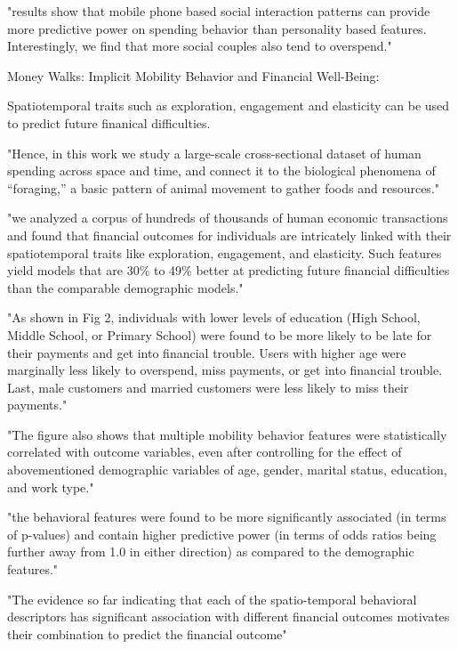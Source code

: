 {"results show that mobile phone based social interaction patterns can provide more predictive power on spending behavior than personality based features. Interestingly, we find that more social couples also tend to overspend."




Money Walks: Implicit Mobility Behavior and Financial Well-Being:

Spatiotemporal traits such as exploration, engagement and elasticity can be used to predict future finanical difficulties. 

"Hence, in this work we study a large-scale cross-sectional dataset of human spending across space and time, and connect it to the biological phenomena of “foraging,” a basic pattern of animal movement to gather foods and resources."

"we analyzed a corpus of hundreds of thousands of human economic transactions and found that financial outcomes for individuals are intricately linked with their spatiotemporal traits like exploration, engagement, and elasticity. Such features yield models that are 30\% to 49\% better at predicting future financial difficulties than the comparable demographic models."

"As shown in Fig 2, individuals with lower levels of education (High School, Middle School, or Primary School) were found to be more likely to be late for their payments and get into financial trouble. Users with higher age were marginally less likely to overspend, miss payments, or get into financial trouble. Last, male customers and married customers were less likely to miss their payments."

"The figure also shows that multiple mobility behavior features were statistically correlated with outcome variables, even after controlling for the effect of abovementioned demographic variables of age, gender, marital status, education, and work type."

"the behavioral features were found to be more significantly associated (in terms of p-values) and contain higher predictive power (in terms of odds ratios being further away from 1.0 in either direction) as compared to the demographic features."

"The evidence so far indicating that each of the spatio-temporal behavioral descriptors has significant association with different financial outcomes motivates their combination to predict the financial outcome"




}
